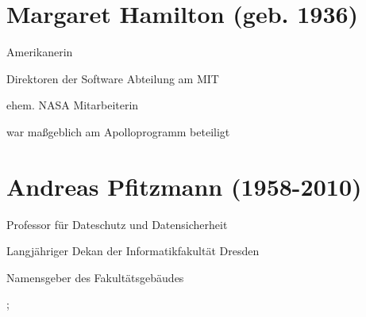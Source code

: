 \documentclass[a4paper,12pt]{report}
\begin{document}
\section*{Margaret Hamilton (geb. 1936)}
\begin{itemize*}
    \item Amerikanerin
    \item Direktoren der Software Abteilung am MIT
    \item ehem. NASA Mitarbeiterin
    \item war maßgeblich am Apolloprogramm beteiligt
\end{itemize*}

\section*{Andreas Pfitzmann (1958-2010)}
\begin{itemize*}
    \item Professor für Dateschutz und Datensicherheit
    \item Langjähriger Dekan der Informatikfakultät Dresden
    \item Namensgeber des Fakultätsgebäudes
\end{itemize*}

\pagebreak
    
    ;
\end{document}
